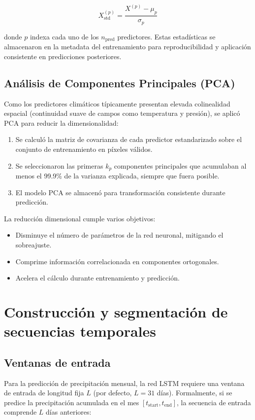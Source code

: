 \begin{equation}
    X_{\text{std}}^{(p)} = \frac{X^{(p)} - \mu_p}{\sigma_p}
\end{equation}

donde $p$ indexa cada uno de los $n_{\text{pred}}$ predictores. Estas estadísticas se almacenaron en la metadata del entrenamiento para reproducibilidad y aplicación consistente en predicciones posteriores.

\subsection{Análisis de Componentes Principales (PCA)}
Como los predictores climáticos típicamente presentan elevada colinealidad espacial (continuidad suave de campos como temperatura y presión), se aplicó PCA para reducir la dimensionalidad:

\begin{enumerate}
    \item Se calculó la matriz de covarianza de cada predictor estandarizado sobre el conjunto de entrenamiento en píxeles válidos.
    \item Se seleccionaron las primeras $k_p$ componentes principales que acumulaban al menos el 99.9\% de la varianza explicada, siempre que fuera posible.
    \item El modelo PCA se almacenó para transformación consistente durante predicción.
\end{enumerate}

La reducción dimensional cumple varios objetivos:
\begin{itemize}
    \item Disminuye el número de parámetros de la red neuronal, mitigando el sobreajuste.
    \item Comprime información correlacionada en componentes ortogonales.
    \item Acelera el cálculo durante entrenamiento y predicción.
\end{itemize}

\section{Construcción y segmentación de secuencias temporales}
\label{sec:secuencias_temporales}

\subsection{Ventanas de entrada}
Para la predicción de precipitación mensual, la red LSTM requiere una ventana de entrada de longitud fija $L$ (por defecto, $L = 31$ días). Formalmente, si se predice la precipitación acumulada en el mes $[t_{\text{start}}, t_{\text{end}}]$, la secuencia de entrada comprende $L$ días anteriores:

